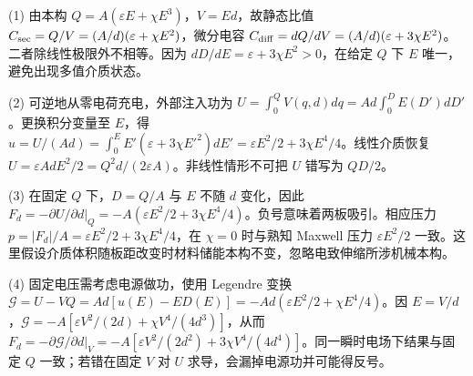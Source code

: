 (1) 由本构 \(Q=A(\varepsilon E+\chi E^3)\)，\(V=Ed\)，故静态比值 \(C_{\rm sec}=Q/V=(A/d)(\varepsilon+\chi E^2)\)，微分电容 \(C_{\rm diff}=dQ/dV=(A/d)(\varepsilon+3\chi E^2)\)。二者除线性极限外不相等。因为 \(dD/dE=\varepsilon+3\chi E^2>0\)，在给定 \(Q\) 下 \(E\) 唯一，避免出现多值介质状态。

(2) 可逆地从零电荷充电，外部注入功为 \(U=\int_0^Q V(q,d)dq=Ad\int_0^{D}E(D')dD'\)。更换积分变量至 \(E\)，得 \(u=U/(Ad)=\int_0^E E'(\varepsilon+3\chi E'^2)dE'=\varepsilon E^2/2+3\chi E^4/4\)。线性介质恢复 \(U=\varepsilon AdE^2/2=Q^2d/(2\varepsilon A)\)。非线性情形不可把 \(U\) 错写为 \(QD/2\)。

(3) 在固定 \(Q\) 下，\(D=Q/A\) 与 \(E\) 不随 \(d\) 变化，因此 \(F_d=-\partial U/\partial d|_Q=-A(\varepsilon E^2/2+3\chi E^4/4)\)。负号意味着两板吸引。相应压力 \(p=|F_d|/A=\varepsilon E^2/2+3\chi E^4/4\)，在 \(\chi=0\) 时与熟知 Maxwell 压力 \(\varepsilon E^2/2\) 一致。这里假设介质体积随板距改变时材料储能本构不变，忽略电致伸缩所涉机械本构。

(4) 固定电压需考虑电源做功，使用 Legendre 变换 \(\mathcal G=U-VQ=Ad[u(E)-ED(E)]=-Ad(\varepsilon E^2/2+\chi E^4/4)\)。因 \(E=V/d\)，\(\mathcal G=-A[\varepsilon V^2/(2d)+\chi V^4/(4d^3)]\)，从而 \(F_d=-\partial\mathcal G/\partial d|_V=-A[\varepsilon V^2/(2d^2)+3\chi V^4/(4d^4)]\)。同一瞬时电场下结果与固定 \(Q\) 一致；若错在固定 \(V\) 对 \(U\) 求导，会漏掉电源功并可能得反号。
